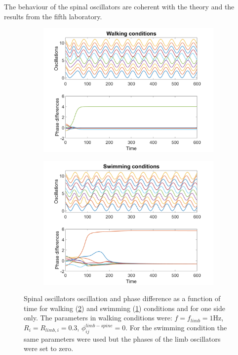 \documentclass[a4paper]{scrartcl}
\begin{document}
{The behaviour of the spinal oscillators are coherent with the theory and the results from the fifth laboratory.

\begin{figure}
 \centering
 \begin{subfigure}[b]{\linewidth}
  \centering
  \includegraphics[width=\textwidth]{Figures/figure1A.png}
  \caption{\label{fig:lags_swim}}
 \end{subfigure}
 \begin{subfigure}[b]{\linewidth}
  \centering
  \includegraphics[width=\textwidth]{Figures/figure1B.png}
  \caption{\label{fig:lags_walk}}
 \end{subfigure}
 \caption{\label{fig:lags_comp} Spinal oscillators oscillation and phase difference as a function of time for walking (\ref{fig:lags_walk}) and swimming (\ref{fig:lags_swim}) conditions and for one side only. The parameters in walking conditions were: $f=f_{limb}=1$Hz, $R_{i}=R_{limb,i}=0.3$, $\phi_{ij}^{limb-spine}=0$. For the swimming condition the same parameters were used but the phases of the limb oscillators were set to zero.}
\end{figure}

}
\end{document}

